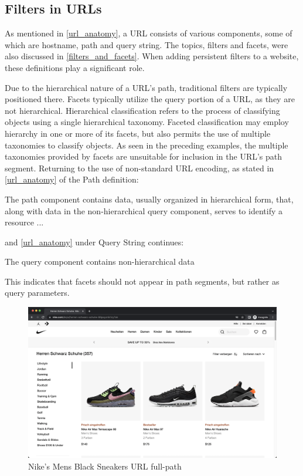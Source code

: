 \subsection*{Filters in URLs}
As mentioned in \autoref{url_anatomy}, a URL consists of various components, some of which are hostname, path and query string. The topics, filters and facets, were also discussed in \autoref{filters_and_facets}. When adding persistent filters to a website, these definitions play a significant role.

Due to the hierarchical nature of a URL's path, traditional filters are typically positioned there. Facets typically utilize the query portion of a URL, as they are not hierarchical. Hierarchical classification refers to the process of classifying objects using a single hierarchical taxonomy. Faceted classification may employ hierarchy in one or more of its facets, but also permits the use of multiple taxonomies to classify objects. As seen in the preceding examples, the multiple taxonomies provided by facets are unsuitable for inclusion in the URL's path segment. Returning to the use of non-standard URL encoding, as stated in \autoref{url_anatomy} of the Path definition:

\begin{displayquote}
  The path component contains data, usually organized in hierarchical form, that, along with data in the non-hierarchical query component, serves to identify a resource ...
\end{displayquote}

\noindent and \autoref{url_anatomy} under Query String continues:

\begin{displayquote}
  The query component contains non-hierarchical data
\end{displayquote}

\noindent This indicates that facets should not appear in path segments, but rather as query parameters.

\begin{figure}[H]
  \includegraphics[width=\textwidth]{assets/screenshot_nike_website.png}
  \caption{Nike's Mens Black Sneakers URL full-path}
  \label{fig:nikeMensBlackSneakersUrl}
\end{figure}

